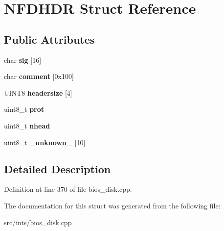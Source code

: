 \hypertarget{structNFDHDR}{\section{N\-F\-D\-H\-D\-R Struct Reference}
\label{structNFDHDR}
}
\subsection*{Public Attributes}
\begin{DoxyCompactItemize}
\item 
\hypertarget{structNFDHDR_a287510a3fba986d88360a51b86662a47}{char {\bfseries sig} \mbox{[}16\mbox{]}}\label{structNFDHDR_a287510a3fba986d88360a51b86662a47}

\item 
\hypertarget{structNFDHDR_a350778cea68716b43c76ae565493e0b7}{char {\bfseries comment} \mbox{[}0x100\mbox{]}}\label{structNFDHDR_a350778cea68716b43c76ae565493e0b7}

\item 
\hypertarget{structNFDHDR_a723cd4bc047e73bed07a4d73194b6f66}{U\-I\-N\-T8 {\bfseries headersize} \mbox{[}4\mbox{]}}\label{structNFDHDR_a723cd4bc047e73bed07a4d73194b6f66}

\item 
\hypertarget{structNFDHDR_a21bbc9bc51e0c4d60f4a346d3200a711}{uint8\-\_\-t {\bfseries prot}}\label{structNFDHDR_a21bbc9bc51e0c4d60f4a346d3200a711}

\item 
\hypertarget{structNFDHDR_aaa6f51d022023940a082286c901d5d48}{uint8\-\_\-t {\bfseries nhead}}\label{structNFDHDR_aaa6f51d022023940a082286c901d5d48}

\item 
\hypertarget{structNFDHDR_a00502b1eed3b27288390871c82277f7d}{uint8\-\_\-t {\bfseries \-\_\-unknown\-\_\-} \mbox{[}10\mbox{]}}\label{structNFDHDR_a00502b1eed3b27288390871c82277f7d}

\end{DoxyCompactItemize}


\subsection{Detailed Description}


Definition at line 370 of file bios\-\_\-disk.\-cpp.



The documentation for this struct was generated from the following file\-:\begin{DoxyCompactItemize}
\item 
src/ints/bios\-\_\-disk.\-cpp\end{DoxyCompactItemize}
